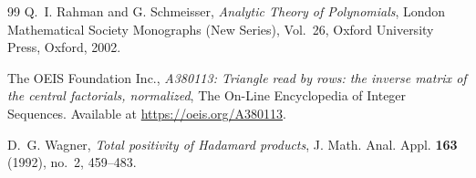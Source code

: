 \documentclass[a4paper,11pt,reqno]{amsart}
\numberwithin{equation}{section}
\theoremstyle{remark}
\begin{document}
\begin{thebibliography}{99}
Q.~I. Rahman and G. Schmeisser,
\emph{Analytic Theory of Polynomials},
London Mathematical Society Monographs (New Series), Vol.~26,
Oxford University Press, Oxford, 2002.

The OEIS Foundation Inc.,
\emph{A380113: Triangle read by rows: the inverse matrix of the central factorials, normalized},
The On-Line Encyclopedia of Integer Sequences.
Available at \url{https://oeis.org/A380113}.

D.~G. Wagner,
\emph{Total positivity of Hadamard products},
J. Math. Anal. Appl. \textbf{163} (1992), no.~2, 459--483.

\end{thebibliography}
\end{document}
